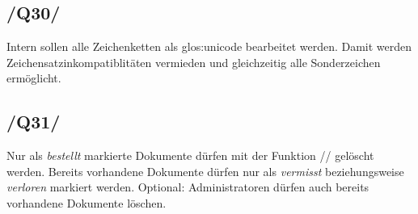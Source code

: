 \subsection{/Q30/} Intern sollen alle Zeichenketten als \Gls{glos:unicode} bearbeitet werden. Damit werden Zeichensatzinkompatiblitäten vermieden und gleichzeitig alle Sonderzeichen ermöglicht.
\subsection{/Q31/} Nur als \emph{bestellt} markierte Dokumente dürfen mit der Funktion // gelöscht werden. Bereits vorhandene Dokumente dürfen nur als \emph{vermisst} beziehungsweise \emph{verloren} markiert werden. Optional: Administratoren dürfen auch bereits vorhandene Dokumente löschen.
